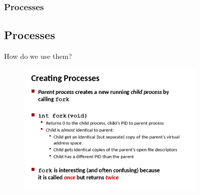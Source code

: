 \documentclass{beamer}
\begin{document}
%
%
%
\begin{frame}
\frametitle{Processes}
\subsection{Processes}
How do we use them?

\begin{figure}
\includegraphics[width=0.8\textwidth]{images/creating-processes.png}
\end{figure}

\end{frame}
\end{document}
